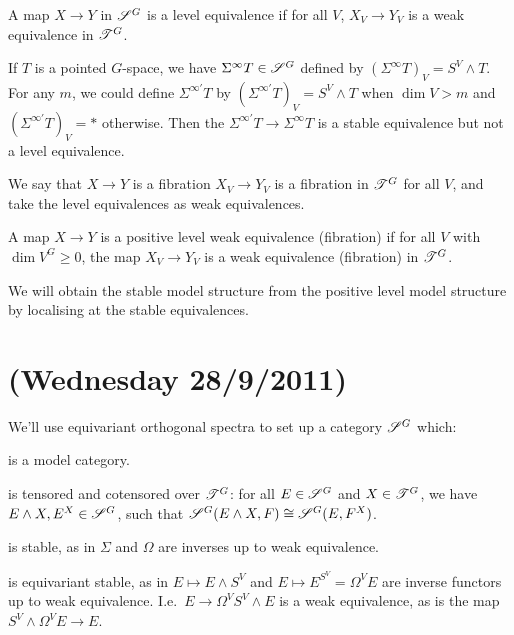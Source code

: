\documentclass[11pt]{article}
\newcommand{\NewLecture}[3]{\section{#1 {\small(#2/#3/2011)}}}
\begin{document}
\begin{FifthWeek}
\begin{defn*}
A map $X\to Y$ in $\mathscr{S}^G$ is a level equivalence if for all $V$, $X_V\to Y_V$ is a weak equivalence in $\mathscr{T}^G$.
\end{defn*}
\begin{exmp*}
If $T$ is a pointed $G$-space, we have $\Sigma^\infty T\in\mathscr{S}^G$ defined by $(\Sigma^\infty T)_V=S^V\wedge T$. For any $m$, we could define $\Sigma^{\infty'}T$ by $(\Sigma^{\infty'} T)_V=S^V\wedge T$ when $\dim V>m$ and $(\Sigma^{\infty'} T)_V=\ast$ otherwise. Then the $\Sigma^{\infty'}T\to\Sigma^{\infty}T$ is a stable equivalence but not a level equivalence.
\end{exmp*}
\begin{defn*}
We say that $X\to Y$ is a fibration \Iff $X_V\to Y_V$ is a fibration in $\mathscr{T}^G$ for all $V$, and take the level equivalences as weak equivalences.
\end{defn*}
\begin{defn*}
A map $X\to Y$ is a positive level weak equivalence (fibration) if for all $V$ with $\dim V^G\geq0$, the map $X_V\to Y_V$ is a weak equivalence (fibration) in $\mathscr{T}^G$.
\end{defn*}
We will obtain the stable model structure from the positive level model structure by localising at the stable equivalences. 
\NewLecture{}{Wednesday 28}{9}
We'll use equivariant orthogonal spectra to set up a category $\mathscr{S}^G$ which:
\begin{itemise}
\item is a model category.
\item is tensored and cotensored over $\mathscr{T}^G$: for all $E\in\mathscr{S}^G$ and $X\in\mathscr{T}^G$, we have $E\wedge X,E^X\in\mathscr{S}^G$, such that $\mathscr{S}^G(E\wedge X,F)\cong \mathscr{S}^G(E,F^X)$.
\item is stable, as in $\Sigma$ and $\Omega$ are inverses up to weak equivalence. 
\item is equivariant stable, as in $E\mapsto E\wedge S^V$ and $E\mapsto E^{S^V}=\Omega^VE$ are inverse functors up to weak equivalence. I.e.\ $E\to \Omega^V S^V\wedge E$ is a weak equivalence, as is the map $S^V\wedge \Omega^V E\to E$. 

\end{itemise}
\end{FifthWeek}
\end{document}
